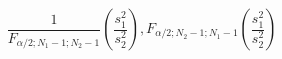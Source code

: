 

\[
\frac{1}{F_{\alpha/2;N_1 - 1;N_2 - 1}} \left( \frac{s_1^2} {s_2^2}\right), F_{\alpha/2;N_2 - 1; N_1 - 1} \left( \frac{s_1^2} {s_2^2}\right)
\]


